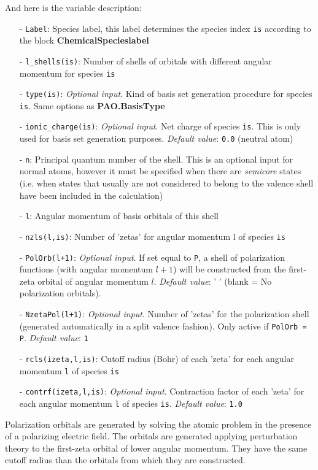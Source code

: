\begin{description}
\noindent
And here is the variable description:
\begin{itemize}
\item[-] {\tt Label}: Species label, this label determines 
the species index {\tt is} according to the block {\bf ChemicalSpecieslabel}
\item[-] {\tt l\_shells(is)}: Number of shells of orbitals 
with different angular momentum for species {\tt is}  
\item[-] {\tt type(is)}: {\it Optional input}.
Kind of basis set generation procedure for species {\tt is}. 
Same options as {\bf PAO.BasisType}
\item[-] {\tt ionic\_charge(is)}: {\it Optional input}. 
Net charge of species {\tt is}. This is  only used for
basis set generation purposes. {\it Default value}: {\tt 0.0} (neutral atom)
\item[-] {\tt n}: Principal quantum number of the shell. This is an optional 
input for normal atoms, however it must be specified when there are
{\it semicore} states (i.e. when states that usually are not 
considered to belong to the 
valence shell have been included in the calculation)
\item[-] {\tt l}: Angular momentum of 
basis orbitals of this shell
\item[-] {\tt nzls(l,is)}: Number of 'zetas' for angular 
momentum l of species {\tt is}
\item[-] {\tt PolOrb(l+1)}: {\it Optional input}. If set equal to {\tt P}, a 
shell of  
polarization functions (with angular momentum $l+1$)  will be constructed 
from the first-zeta orbital of angular momentum $l$. {\it Default value}: ' ' 
(blank = No polarization orbitals). 
\item[-] {\tt NzetaPol(l+1)}: {\it Optional input}. Number of
'zetas' for the 
polarization shell (generated automatically in a split valence fashion). 
Only active if {\tt PolOrb = P}. {\it Default value}: {\tt 1} 
\item[-] {\tt rcls(izeta,l,is)}: Cutoff radius (Bohr) of 
each 'zeta' for each angular momentum {\tt l} of species {\tt is}
\item[-] {\tt contrf(izeta,l,is)}: {\it Optional input}. 
Contraction factor of 
each 'zeta' for each angular momentum {\tt l} of species {\tt is}.
{\it Default value}: {\tt 1.0}
\end{itemize} 

Polarization orbitals 
are generated by solving the atomic problem in the presence of a 
polarizing electric field. The orbitals are generated applying perturbation
theory to the first-zeta orbital of lower angular momentum. 
They have the same cutoff radius than the orbitals from which
they are constructed. 


\end{description}
